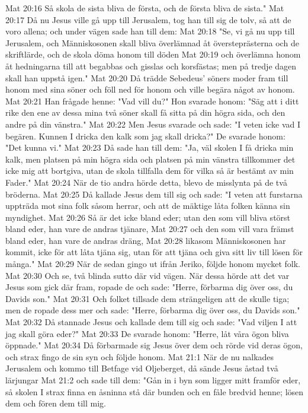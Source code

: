Mat 20:16  Så skola de sista bliva de första, och de första bliva de sista."
Mat 20:17  Då nu Jesus ville gå upp till Jerusalem, tog han till sig de tolv, så att de voro allena; och under vägen sade han till dem:
Mat 20:18  "Se, vi gå nu upp till Jerusalem, och Människosonen skall bliva överlämnad åt översteprästerna och de skriftlärde, och de skola döma honom till döden
Mat 20:19  och överlämna honom åt hedningarna till att begabbas och gisslas och korsfästas; men på tredje dagen skall han uppstå igen."
Mat 20:20  Då trädde Sebedeus' söners moder fram till honom med sina söner och föll ned för honom och ville begära något av honom.
Mat 20:21  Han frågade henne: "Vad vill du?" Hon svarade honom: "Säg att i ditt rike den ene av dessa mina två söner skall få sitta på din högra sida, och den andre på din vänstra."
Mat 20:22  Men Jesus svarade och sade: "I veten icke vad I begären. Kunnen I dricka den kalk som jag skall dricka?" De svarade honom: "Det kunna vi."
Mat 20:23  Då sade han till dem: "Ja, väl skolen I få dricka min kalk, men platsen på min högra sida och platsen på min vänstra tillkommer det icke mig att bortgiva, utan de skola tillfalla dem för vilka så är bestämt av min Fader."
Mat 20:24  När de tio andra hörde detta, blevo de misslynta på de två bröderna.
Mat 20:25  Då kallade Jesus dem till sig och sade: "I veten att furstarna uppträda mot sina folk såsom herrar, och att de mäktige låta folken känna sin myndighet.
Mat 20:26  Så är det icke bland eder; utan den som vill bliva störst bland eder, han vare de andras tjänare,
Mat 20:27  och den som vill vara främst bland eder, han vare de andras dräng,
Mat 20:28  likasom Människosonen har kommit, icke för att låta tjäna sig, utan för att tjäna och giva sitt liv till lösen för många."
Mat 20:29  När de sedan gingo ut ifrån Jeriko, följde honom mycket folk.
Mat 20:30  Och se, två blinda sutto där vid vägen. När dessa hörde att det var Jesus som gick där fram, ropade de och sade: "Herre, förbarma dig över oss, du Davids son."
Mat 20:31  Och folket tillsade dem strängeligen att de skulle tiga; men de ropade dess mer och sade: "Herre, förbarma dig över oss, du Davids son."
Mat 20:32  Då stannade Jesus och kallade dem till sig och sade: "Vad viljen I att jag skall göra eder?"
Mat 20:33  De svarade honom: "Herre, låt våra ögon bliva öppnade."
Mat 20:34  Då förbarmade sig Jesus över dem och rörde vid deras ögon, och strax fingo de sin syn och följde honom.
Mat 21:1  När de nu nalkades Jerusalem och kommo till Betfage vid Oljeberget, då sände Jesus åstad två lärjungar
Mat 21:2  och sade till dem: "Gån in i byn som ligger mitt framför eder, så skolen I strax finna en åsninna stå där bunden och en fåle bredvid henne; lösen dem och fören dem till mig.
